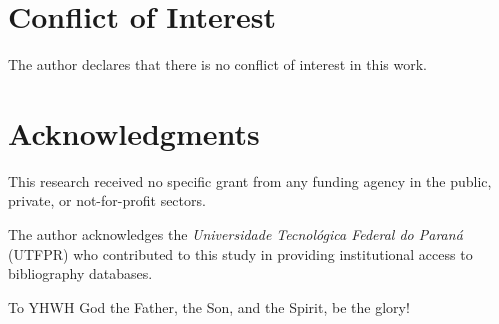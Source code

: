 
\section*{Conflict of Interest}

    The author declares that there is no conflict of interest in this work.



%



\section*{Acknowledgments}

    This research received no specific grant from any funding agency in the public, private,  or
    not-for-profit sectors.

    The author acknowledges the \textit{Universidade Tecnológica Federal do Paraná} (UTFPR)  who
    contributed to this study in providing institutional access to bibliography databases.

    To YHWH God the Father, the Son, and the Spirit, be the glory!




